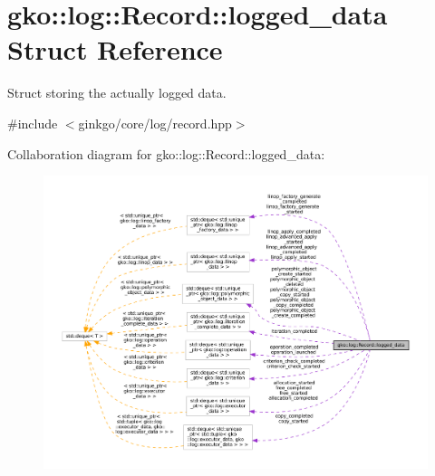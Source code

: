 \hypertarget{structgko_1_1log_1_1Record_1_1logged__data}{}\section{gko\+:\+:log\+:\+:Record\+:\+:logged\+\_\+data Struct Reference}
\label{structgko_1_1log_1_1Record_1_1logged__data}


Struct storing the actually logged data.  




{\ttfamily \#include $<$ginkgo/core/log/record.\+hpp$>$}



Collaboration diagram for gko\+:\+:log\+:\+:Record\+:\+:logged\+\_\+data\+:
\nopagebreak
\begin{figure}[H]
\begin{center}
\leavevmode
\includegraphics[width=350pt]{structgko_1_1log_1_1Record_1_1logged__data__coll__graph}
\end{center}
\end{figure}
